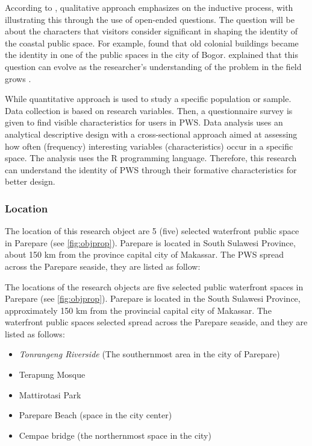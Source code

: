 \documentclass[draft, ../riset_senja.tex]{subfiles}
\begin{document}
According to \cite{groat2013}, qualitative approach emphasizes on the inductive process, with \citeauthor{creswell2016} illustrating this through the use of open-ended questions. The question will be about the characters that visitors consider significant in shaping the identity of the coastal public space.
For example, \cite{hartanti2019} found that old colonial buildings became the identity in one of the public spaces in the city of Bogor.
\cite{creswell2016} explained that this question can evolve as the researcher's understanding of the problem in the field grows \citep{creswell2016}.

While quantitative approach is used to study a specific population or sample.
Data collection is based on research variables. Then, a questionnaire survey is given to find visible characteristics for users in PWS.
Data analysis uses an analytical descriptive design with a cross-sectional approach aimed at assessing how often (frequency) interesting variables (characteristics) occur in a specific space. The analysis uses the R programming language.
Therefore, this research can understand the identity of PWS through their formative characteristics for better design.

\subsubsection{Location}%
\label{ssub:Location}

The location of this research object are 5 (five) selected waterfront public space in Parepare (see \ref{fig:objprop}).
Parepare is located in South Sulawesi Province, about 150 km from the province capital city of Makassar.
The PWS spread across the Parepare seaside, they are listed as follow:

The locations of the research objects are five selected  public waterfront spaces in Parepare (see \ref{fig:objprop}).
Parepare is located in the South Sulawesi Province, approximately 150 km from the provincial capital city of Makassar.
The waterfront public spaces selected spread across the Parepare seaside, and they are listed as follows:

\begin{itemize}
	\item \textit{Tonrangeng Riverside} (The southernmost area in the city of Parepare)
	\item  Terapung Mosque
	\item Mattirotasi Park
	\item Parepare Beach (space in the city center)
	\item  Cempae bridge (the northernmost space in the city)
\end{itemize}
\end{document}
